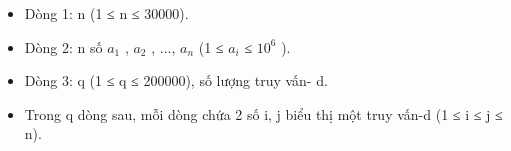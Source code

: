 \begin{itemize}
	\item     Dòng 1: n (1 ≤ n ≤ 30000).   
	\item     Dòng 2: n số $a_{1}$    , $a_{2}$    , ...,   $a_{n}$    (1 ≤ $a_{i}$    ≤   $10^{6}$    ).   
	\item     Dòng 3: q (1 ≤ q ≤ 200000), số lượng truy vấn-  d.   
	\item     Trong q dòng sau, mỗi dòng chứa 2 số i, j biểu thị một   truy vấn-d (1 ≤ i ≤ j ≤ n).   
\end{itemize}